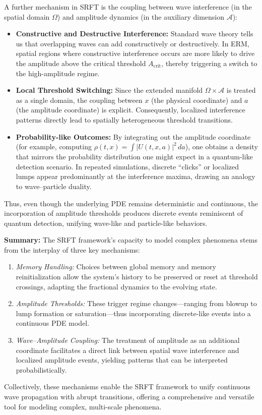 \documentclass[12pt]{article}
\begin{document}
A further mechanism in SRFT is the coupling between wave interference (in the spatial domain $\Omega$) and amplitude dynamics (in the auxiliary dimension $\mathcal{A}$):
\begin{itemize}
    \item \textbf{Constructive and Destructive Interference:}  
          Standard wave theory tells us that overlapping waves can add constructively or destructively. In ERM, spatial regions where constructive interference occurs are more likely to drive the amplitude above the critical threshold $A_{\mathrm{crit}}$, thereby triggering a switch to the high-amplitude regime.
    \item \textbf{Local Threshold Switching:}  
          Since the extended manifold $\Omega \times \mathcal{A}$ is treated as a single domain, the coupling between $x$ (the physical coordinate) and $a$ (the amplitude coordinate) is explicit. Consequently, localized interference patterns directly lead to spatially heterogeneous threshold transitions.
    \item \textbf{Probability-like Outcomes:}  
          By integrating out the amplitude coordinate (for example, computing $\rho(t,x)=\int |U(t,x,a)|^2\,da$), one obtains a density that mirrors the probability distribution one might expect in a quantum-like detection scenario. In repeated simulations, discrete “clicks” or localized lumps appear predominantly at the interference maxima, drawing an analogy to wave–particle duality.
\end{itemize}
Thus, even though the underlying PDE remains deterministic and continuous, the incorporation of amplitude thresholds produces discrete events reminiscent of quantum detection, unifying wave-like and particle-like behaviors.

\medskip

\noindent
\textbf{Summary:}  
The SRFT framework’s capacity to model complex phenomena stems from the interplay of three key mechanisms:
\begin{enumerate}
    \item \emph{Memory Handling:} Choices between global memory and memory reinitialization allow the system’s history to be preserved or reset at threshold crossings, adapting the fractional dynamics to the evolving state.
    \item \emph{Amplitude Thresholds:} These trigger regime changes—ranging from blowup to lump formation or saturation—thus incorporating discrete-like events into a continuous PDE model.
    \item \emph{Wave–Amplitude Coupling:} The treatment of amplitude as an additional coordinate facilitates a direct link between spatial wave interference and localized amplitude events, yielding patterns that can be interpreted probabilistically.
\end{enumerate}
Collectively, these mechanisms enable the SRFT framework to unify continuous wave propagation with abrupt transitions, offering a comprehensive and versatile tool for modeling complex, multi-scale phenomena.
\end{document}
